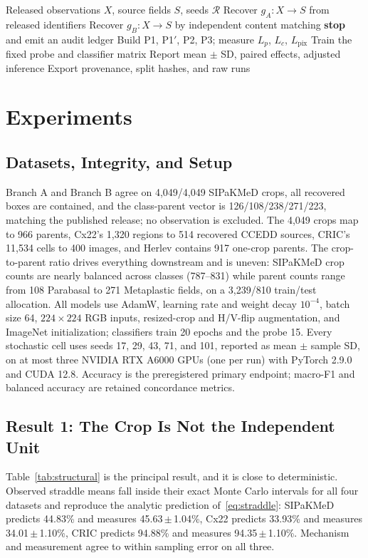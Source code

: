 \documentclass[conference]{IEEEtran}
\newcommand{\meanpm}[2]{#1\,$\pm$\,#2}
\newcommand{\protocol}[1]{\textsf{#1}}
\begin{document}
\begin{algorithm}[t]
\caption{Fail-closed provenance-aware evaluation}
\label{alg:cytofair}
\small
\begin{algorithmic}[1]
\Require Released observations $X$, source fields $S$, seeds $\mathcal{R}$
\State Recover $g_A:X\!\to\!S$ from released identifiers
\State Recover $g_B:X\!\to\!S$ by independent content matching
    \State \textbf{stop} and emit an audit ledger
\EndIf
{}
    \State Build \protocol{P1}, \protocol{P1$'$}, \protocol{P2}, \protocol{P3}; measure $L_p$, $L_c$, $L_{\mathrm{pix}}$
    \State Train the fixed probe and classifier matrix
\EndFor
\State Report mean $\pm$ SD, paired effects, adjusted inference
\State Export provenance, split hashes, and raw runs
\end{algorithmic}
\end{algorithm}

\section{Experiments}
\subsection{Datasets, Integrity, and Setup}
Branch A and Branch B agree on 4,049/4,049 SIPaKMeD crops, all recovered boxes are contained, and the class-parent vector is 126/108/238/271/223, matching the published release; no observation is excluded.
The 4,049 crops map to 966 parents, Cx22's 1,320 regions to 514 recovered CCEDD sources, CRIC's 11,534 cells to 400 images, and Herlev contains 917 one-crop parents.
The crop-to-parent ratio drives everything downstream and is uneven: SIPaKMeD crop counts are nearly balanced across classes (787--831) while parent counts range from 108 Parabasal to 271 Metaplastic fields, on a 3,239/810 train/test allocation.
All models use AdamW, learning rate and weight decay $10^{-4}$, batch size 64, $224\times224$ RGB inputs, resized-crop and H/V-flip augmentation, and ImageNet initialization; classifiers train 20 epochs and the probe 15.
Every stochastic cell uses seeds 17, 29, 43, 71, and 101, reported as mean $\pm$ sample SD, on at most three NVIDIA RTX A6000 GPUs (one per run) with PyTorch 2.9.0 and CUDA 12.8.
Accuracy is the preregistered primary endpoint; macro-F1 and balanced accuracy are retained concordance metrics.

\subsection{Result 1: The Crop Is Not the Independent Unit}
Table~\ref{tab:structural} is the principal result, and it is close to deterministic.
Observed straddle means fall inside their exact Monte Carlo intervals for all four datasets and reproduce the analytic prediction of~\eqref{eq:straddle}: SIPaKMeD predicts 44.83\% and measures \meanpm{45.63}{1.04}\%, Cx22 predicts 33.93\% and measures \meanpm{34.01}{1.10}\%, CRIC predicts 94.88\% and measures \meanpm{94.35}{1.10}\%.
Mechanism and measurement agree to within sampling error on all three.
\end{document}
